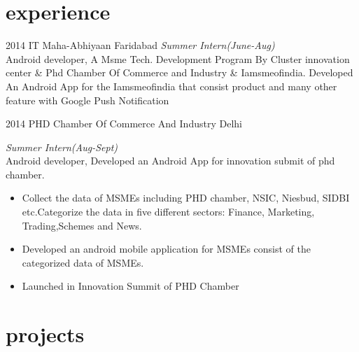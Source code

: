 \documentclass[]{friggeri-cv}
\begin{document}
\section{experience}

\begin{entrylist}
  \entry
    {2014}
    {IT Maha-Abhiyaan}
    {Faridabad}
    {\emph{Summer Intern(June-Aug)}\\ Android developer, A Msme Tech. Development Program By Cluster innovation center \& Phd Chamber Of Commerce and Industry \& Iamsmeofindia. \newline Developed An Android App for the Iamsmeofindia that consist product and many other feature with Google Push Notification}

  \entry
    {2014}
    {PHD Chamber Of Commerce And Industry}
    {Delhi}
    {\emph{Summer Intern(Aug-Sept)}\\ Android developer, Developed an Android App for innovation submit of phd chamber. \begin{itemize}
    \item Collect the data of MSMEs including PHD chamber, NSIC, Niesbud, SIDBI etc.Categorize the data in five different sectors: Finance, Marketing, Trading,Schemes and News.
    \item Developed an android mobile application for MSMEs consist of the categorized data of MSMEs.
    \item Launched in Innovation Summit of PHD Chamber
    \end{itemize}}
   
\end{entrylist} 

\section{projects}
\end{document}
